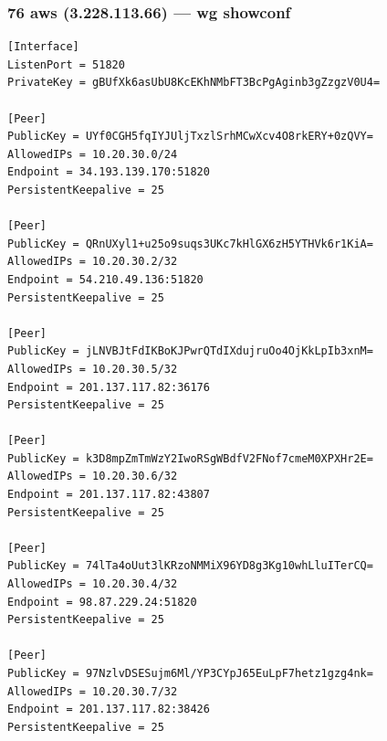 \documentclass[11pt,a4paper]{article}
\begin{document}
\subsubsection*{76 aws (3.228.113.66) — wg showconf}
\begin{lstlisting}
[Interface]
ListenPort = 51820
PrivateKey = gBUfXk6asUbU8KcEKhNMbFT3BcPgAginb3gZzgzV0U4=

[Peer]
PublicKey = UYf0CGH5fqIYJUljTxzlSrhMCwXcv4O8rkERY+0zQVY=
AllowedIPs = 10.20.30.0/24
Endpoint = 34.193.139.170:51820
PersistentKeepalive = 25

[Peer]
PublicKey = QRnUXyl1+u25o9suqs3UKc7kHlGX6zH5YTHVk6r1KiA=
AllowedIPs = 10.20.30.2/32
Endpoint = 54.210.49.136:51820
PersistentKeepalive = 25

[Peer]
PublicKey = jLNVBJtFdIKBoKJPwrQTdIXdujruOo4OjKkLpIb3xnM=
AllowedIPs = 10.20.30.5/32
Endpoint = 201.137.117.82:36176
PersistentKeepalive = 25

[Peer]
PublicKey = k3D8mpZmTmWzY2IwoRSgWBdfV2FNof7cmeM0XPXHr2E=
AllowedIPs = 10.20.30.6/32
Endpoint = 201.137.117.82:43807
PersistentKeepalive = 25

[Peer]
PublicKey = 74lTa4oUut3lKRzoNMMiX96YD8g3Kg10whLluITerCQ=
AllowedIPs = 10.20.30.4/32
Endpoint = 98.87.229.24:51820
PersistentKeepalive = 25

[Peer]
PublicKey = 97NzlvDSESujm6Ml/YP3CYpJ65EuLpF7hetz1gzg4nk=
AllowedIPs = 10.20.30.7/32
Endpoint = 201.137.117.82:38426
PersistentKeepalive = 25

\end{lstlisting}
\end{document}
